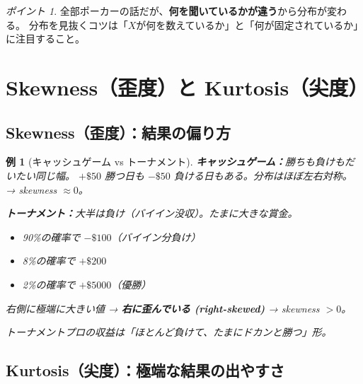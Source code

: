 \documentclass{article}
\newtheorem{example}{例}[section]
\theoremstyle{remark}
\newtheorem*{point}{ポイント}
\begin{document}
\begin{point}
  全部ポーカーの話だが、\textbf{何を聞いているかが違う}から分布が変わる。
  分布を見抜くコツは「$X$が何を数えているか」と「何が固定されているか」に注目すること。
\end{point}

\section{Skewness（歪度）と Kurtosis（尖度）}

\subsection{Skewness（歪度）：結果の偏り方}

\begin{example}[キャッシュゲーム vs トーナメント]

  \textbf{キャッシュゲーム：}勝ちも負けもだいたい同じ幅。
  $+\$50$ 勝つ日も $-\$50$ 負ける日もある。分布はほぼ左右対称。
  → skewness $\approx 0$。

  \textbf{トーナメント：}大半は負け（バイイン没収）。たまに大きな賞金。
  \begin{itemize}
    \item 90\%の確率で $-\$100$（バイイン分負け）
    \item 8\%の確率で $+\$200$
    \item 2\%の確率で $+\$5000$（優勝）
  \end{itemize}
  右側に極端に大きい値 → \textbf{右に歪んでいる (right-skewed)} → skewness $> 0$。

  トーナメントプロの収益は「ほとんど負けて、たまにドカンと勝つ」形。
\end{example}

\subsection{Kurtosis（尖度）：極端な結果の出やすさ}
\end{document}
